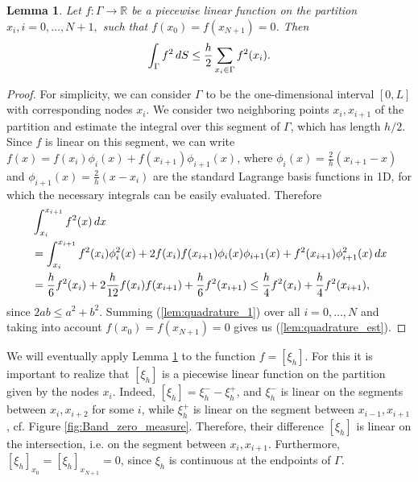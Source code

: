 \documentclass{article}
\newtheorem{lemma}{Lemma}
\theoremstyle{remark}
\def \IR {\mathbb{R}}
\def \d {{\rm d}}
\def\dx{\,\d x }
\def\dS{\,\d S }
\begin{document}
\begin{lemma}
\label{lem:quadrature}
Let $f:\Gamma\to\IR$ be a piecewise linear function on the partition $x_i, i=0,\ldots,N+1,$ such that $f(x_0)=f(x_{N+1})=0$. Then
\begin{equation}
\label{lem:quadrature_est}
\int_\Gamma f^2 \dS\leq \frac{h}{2}\sum_{x_i\in\Gamma} f^2(x_i).
\end{equation} 
\end{lemma}
\begin{proof}
For simplicity, we can consider $\Gamma$ to be the one-dimensional interval $[0,L]$ with corresponding nodes $x_i$. We consider two neighboring points $x_i, x_{i+1}$ of the partition and estimate the integral over this segment of $\Gamma$, which has length $h/2$. Since $f$ is linear on this segment, we can write $f(x)=f(x_i)\phi_i(x)+f(x_{i+1})\phi_{i+1}(x)$, where $\phi_i(x)=\frac{2}{h}(x_{i+1}-x)$ and $\phi_{i+1}(x)=\frac{2}{h}(x-x_{i})$ are the standard Lagrange basis functions in 1D, for which the necessary integrals can be easily evaluated. Therefore
\begin{equation}
\begin{split}
\label{lem:quadrature_1}
&\int_{x_i}^{x_{i+1}} f^2(x) \dx \\ &= \int_{x_i}^{x_{i+1}} f^2(x_i)\phi_i^2(x) +2 f(x_i)f(x_{i+1})\phi_i(x)\phi_{i+1}(x) +f^2(x_{i+1})\phi^2_{i+1}(x)\dx\\
&=\frac{h}{6}f^2(x_{i})+ 2\frac{h}{12}f(x_{i})f(x_{i+1}) +\frac{h}{6}f^2(x_{i+1})\leq \frac{h}{4}f^2(x_{i}) +\frac{h}{4}f^2(x_{i+1}),
\end{split}
\end{equation}
since $2ab\leq a^2+b^2$. Summing (\ref{lem:quadrature_1}) over all $i=0,\ldots,N$ and taking into account $f(x_0)=f(x_{N+1})=0$ gives us (\ref{lem:quadrature_est}).
\end{proof}

We will eventually apply Lemma \ref{lem:quadrature} to the function $f=[\xi_h]$. For this it is important to realize that $[\xi_h]$ is a piecewise linear function on the partition given by the nodes $x_i$. Indeed, $[\xi_h]=\xi_h^--\xi_h^+$, and $\xi_h^-$ is linear on the segments between $x_i, x_{i+2}$ for some $i$, while $\xi_h^+$ is linear on the segment between $x_{i-1}, x_{i+1}$, cf. Figure \ref{fig:Band_zero_measure}. Therefore, their difference $[\xi_h]$ is linear on the intersection, i.e. on the segment between $x_i, x_{i+1}$. Furthermore, $[\xi_h]_{x_0}=[\xi_h]_{x_{N+1}}=0$, since $\xi_h$ is continuous at the endpoints of $\Gamma$.
\end{document}
